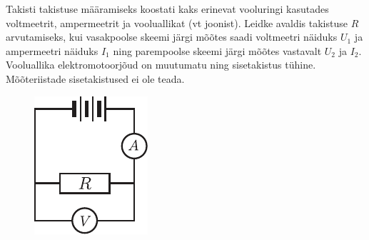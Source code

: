 
Takisti takistuse määramiseks koostati kaks erinevat vooluringi kasutades voltmeetrit, ampermeetrit ja vooluallikat (vt joonist). Leidke avaldis takistuse $R$ arvutamiseks, kui vasakpoolse skeemi järgi mõõtes saadi voltmeetri näiduks $U_1$ ja ampermeetri näiduks $I_1$ ning parempoolse skeemi järgi mõõtes vastavalt $U_2$ ja $I_2$. Vooluallika elektromotoorjõud on muutumatu ning sisetakistus tühine. Mõõteriistade sisetakistused ei ole teada.

\begin{figure}[h]
	\centering
	\begin{minipage}[b]{0.25\textwidth}
		\includegraphics[width=\linewidth]{2005-v2g-04-yl1}
	\end{minipage}
	\hspace{30pt}
	\begin{minipage}[b]{0.3\textwidth}

\end{minipage}
\end{figure}
